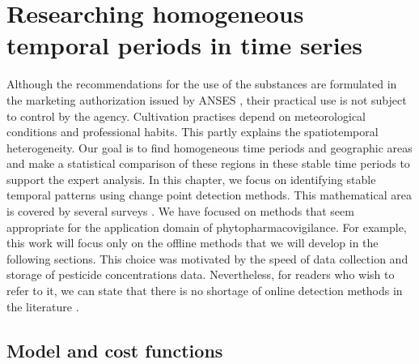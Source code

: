\chapter{Researching homogeneous temporal periods in time series}\label{chp:3}

\minitoc

\clearpage

Although the recommendations for the use of the substances are formulated in the marketing authorization issued by ANSES \cite{ephy}, their practical use is not subject to control by the agency. Cultivation practises depend on meteorological conditions and professional habits. This partly explains the spatiotemporal heterogeneity. Our goal is to find homogeneous time periods and geographic areas and make a statistical comparison of these regions in these stable time periods to support the expert analysis. In this chapter, we focus on identifying stable temporal patterns using change point detection methods. This mathematical area is covered by several surveys \cite{truong2020,basseville1993detection,bardet2020}. We have focused on methods that seem appropriate for the application domain of phytopharmacovigilance. For example, this work will focus only on the offline methods that we will develop in the following sections. This choice was motivated by the speed of data collection and storage of pesticide concentrations data. Nevertheless, for readers who wish to refer to it, we can state that there is no shortage of online detection methods in the literature \cite{liu2017change,Li2021,hohle2010online,ranganathan2010pliss,li2015m}.

\section{Model and cost functions}\label{chp:3:1}

